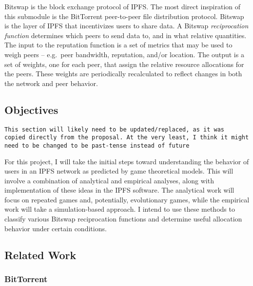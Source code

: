 Bitswap is the block exchange protocol of IPFS. The most direct
inspiration of this submodule is the BitTorrent peer-to-peer file
distribution protocol. Bitswap is the layer of IPFS that incentivizes
users to share data. A Bitswap \emph{reciprocation function} determines
which peers to send data to, and in what relative quantities. The input
to the reputation function is a set of metrics that may be used to weigh
peers -- e.g.~peer bandwidth, reputation, and/or location. The output is
a set of weights, one for each peer, that assign the relative resource
allocations for the peers. These weights are periodically recalculated
to reflect changes in both the network and peer behavior.

\hypertarget{objectives}{%
\subsection{Objectives}\label{objectives}}

\texttt{This\ section\ will\ likely\ need\ to\ be\ updated/replaced,\ as\ it\ was
copied\ directly\ from\ the\ proposal.\ At\ the\ very\ least,\ I\ think\ it\ might
need\ to\ be\ changed\ to\ be\ past-tense\ instead\ of\ future}

For this project, I will take the initial steps toward understanding the
behavior of users in an IPFS network as predicted by game theoretical
models. This will involve a combination of analytical and empirical
analyses, along with implementation of these ideas in the IPFS software.
The analytical work will focus on repeated games and, potentially,
evolutionary games, while the empirical work will take a
simulation-based approach. I intend to use these methods to classify
various Bitswap reciprocation functions and determine useful allocation
behavior under certain conditions.

\hypertarget{related-work}{%
\subsection{Related Work}\label{related-work}}

\hypertarget{bittorrent}{%
\subsubsection{BitTorrent}\label{bittorrent}}

